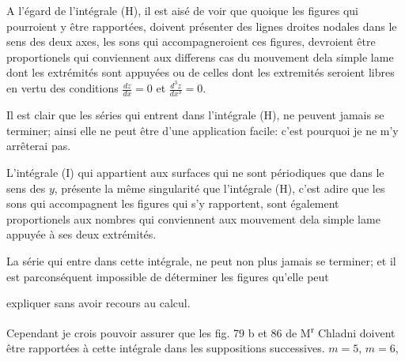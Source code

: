 \documentclass[11pt,a4paper]{article}
\begin{document}

A l'égard de l'intégrale (H), il est aisé de voir que quoique
les figures qui pourroient y être rapportées, doivent présenter des
lignes droites nodales dans le sens des deux axes, les sons qui
accompagneroient ces figures, devroient être proportionels
 qui conviennent aux differens cas du mouvement
dela simple lame dont les extrémités sont appuyées
ou de celles dont les extremités seroient libres en
vertu des conditions $\frac{dz}{dx} = 0$ et $\frac{d^{3}z}{dx^{3}} = 0$.

Il est clair que les séries qui entrent dans l'intégrale
(H), ne peuvent jamais se terminer; ainsi 
elle ne peut être d'une application facile: c'est pourquoi
 je ne m'y arrêterai pas.

L'intégrale (I) qui appartient aux surfaces qui ne sont
périodiques que dans  le sens des $y$, présente la
même singularité que l'intégrale (H), c'est adire
que les  sons qui accompagnent les figures
qui s'y rapportent, sont également proportionels
aux nombres qui conviennent aux mouvement
dela simple lame appuyée à ses deux extrémités.

La série qui entre dans cette intégrale, ne peut
non plus jamais se terminer; et il est parconséquent
impossible de déterminer les figures qu'elle peut


expliquer sans avoir recours au calcul.

Cependant je crois pouvoir assurer que les fig. 79 b et
86 de M\textsuperscript{r} Chladni doivent être rapportées à cette intégrale
dans les suppositions successives. $m = 5$, $m = 6$,
\end{document}

